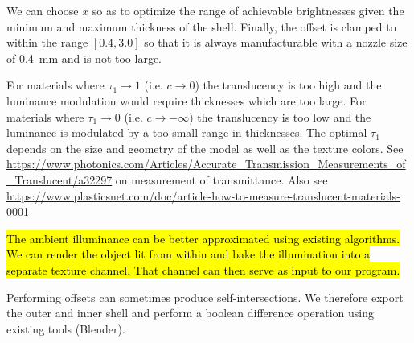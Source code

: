 We can choose $x$ so as to optimize the range of achievable brightnesses given the minimum and maximum thickness of the shell.
Finally, the offset is clamped to within the range $[0.4, 3.0]$ so that it is always manufacturable with a nozzle size of \SI{0.4}{\milli\meter} and is not too large.

For materials where $\tau_1 \to 1$ (i.e. $c \to 0$) the translucency is too high and the luminance modulation would require thicknesses which are too large.
For materials where $\tau_1 \to 0$ (i.e. $c \to -\infty)$ the translucency is too low and the luminance is modulated by a too small range in thicknesses.
The optimal $\tau_1$ depends on the size and geometry of the model as well as the texture colors.
See \url{https://www.photonics.com/Articles/Accurate_Transmission_Measurements_of_Translucent/a32297} on measurement of transmittance.
Also see \url{https://www.plasticsnet.com/doc/article-how-to-measure-translucent-materials-0001}


\hl{The ambient illuminance can be better approximated using existing algorithms.
We can render the object lit from within and bake the illumination into a separate texture channel.
That channel can then serve as input to our program.}


Performing offsets can sometimes produce self-intersections.
We therefore export the outer and inner shell and perform a boolean difference operation using existing tools (Blender).